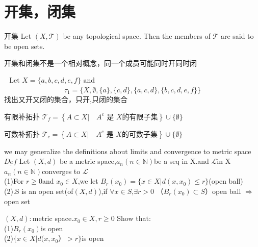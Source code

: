 \documentclass[cn,11pt,chinese,black]{elegantbook}
\begin{document}
\section{开集，闭集}
\begin{definition}{开集}
\noindent Let $(X, \mathcal{T})$ be any topological space. Then the members of $\mathcal{T}$ are said to be open sets.
\end{definition}
\begin{remark}
	开集和闭集不是一个相对概念，同一个成员可能同时开同时闭
\end{remark}
\begin{example}
	$\begin{array}{lll}  \text { Let } X=\{a, b, c, d, e, f\} \text { and }\end{array}$
	\[
	\tau_{1}=\{X, \emptyset,\{a\},\{c, d\},\{a, c, d\},\{b, c, d, e, f\}\}
	\]
	找出又开又闭的集合，只开,只闭的集合
\end{example}
\begin{remark}
	
\end{remark}
\begin{definition}{有限补拓扑}
	$\mathcal{T}_{f}=\left\{A \subset X | \quad A^{c} \text { 是 } X \text {的有限子集}\right\} \cup\{\emptyset\}$
\end{definition}
\begin{definition}{可数补拓扑}
	$\mathcal{T}_{c}=\left\{A \subset X | \quad A^{c} \text { 是 } X \text {的可数子集}\right\} \cup\{\emptyset\}$
\end{definition}
\noindent we may generalize the definitions about limits and convergence to metric space \\
$\underline{Def}$ Let $(X,d)$ be a metric space,$a_n(n \in \mathbb{N})$be a seq in $\mathrm{X}$.and $\mathcal{L}$in X\\
$a_n(n \in \mathbb{N})$converges to $\mathcal{L}$\\
(1)For $r \geq 0$and $x_0 \in X$,we let $B_r(x_0)=\{x \in X|d(x,x_0)\leq r\}$(open ball)\\
(2).S is an open set(of$(X,d)$),if $\forall x \in S$,$\exists r >0$
（$B_r(x_0)\subset S$）open ball $\Rightarrow$open set \\
\begin{exercise}
$(X,d):$metric space.$x_0 \in X,r \geq 0$
Show that:\\
(1)$B_r(x_0)$is open \\
(2)$\{x \in X|d(x,x_0）> r\}$is open
\end{exercise}
\end{document}
